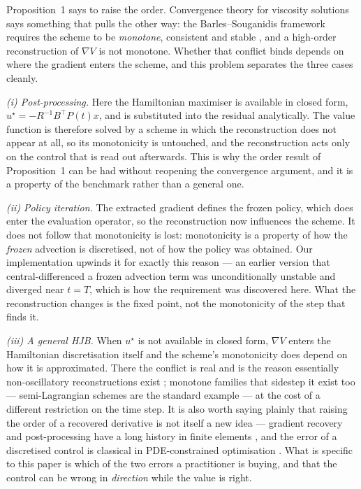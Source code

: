 \documentclass[conference]{IEEEtran}
\begin{document}
Proposition~1 says to raise the order. Convergence theory for viscosity solutions says something that
pulls the other way: the Barles--Souganidis framework requires the scheme to be \emph{monotone},
consistent and stable \cite{barles1991convergence,crandall1983viscosity}, and a high-order
reconstruction of $\nabla V$ is not monotone. Whether that conflict binds depends on where the
gradient enters the scheme, and this problem separates the three cases cleanly.

\emph{(i) Post-processing.} Here the Hamiltonian maximiser is available in closed form,
$u^\star = -R^{-1}B^\top P(t)x$, and is substituted into the residual analytically. The value
function is therefore solved by a scheme in which the reconstruction does not appear at all, so its
monotonicity is untouched, and the reconstruction acts only on the control that is read out
afterwards. This is why the order result of Proposition~1 can be had without reopening the
convergence argument, and it is a property of the benchmark rather than a general one.

\emph{(ii) Policy iteration.} The extracted gradient defines the frozen policy, which does enter the
evaluation operator, so the reconstruction now influences the scheme. It does not follow that
monotonicity is lost: monotonicity is a property of how the \emph{frozen} advection is discretised,
not of how the policy was obtained. Our implementation upwinds it for exactly this reason --- an
earlier version that central-differenced a frozen advection term was unconditionally unstable and
diverged near $t=T$, which is how the requirement was discovered here. What the reconstruction
changes is the fixed point, not the monotonicity of the step that finds it.

\emph{(iii) A general HJB.} When $u^\star$ is not available in closed form, $\nabla V$ enters the
Hamiltonian discretisation itself and the scheme's monotonicity does depend on how it is
approximated. There the conflict is real and is the reason essentially non-oscillatory
reconstructions exist \cite{harten1987uniformly,shu1998essentially,liu1994weighted}; monotone families
that sidestep it exist too --- semi-Lagrangian schemes are the standard example
\cite{falcone2002semi} --- at the cost of a different restriction on the time step. It is also
worth saying plainly that raising the order of a recovered derivative is not itself a new idea ---
gradient recovery and post-processing have a long history in finite elements
\cite{zienkiewicz1992superconvergent,cockburn2003enhanced}, and the error of a discretised control is
classical in PDE-constrained optimisation \cite{falk1973approximation,hinze2009optimization}. What is
specific to this paper is which of the two errors a practitioner is buying, and that the control can
be wrong in \emph{direction} while the value is right.
\end{document}
